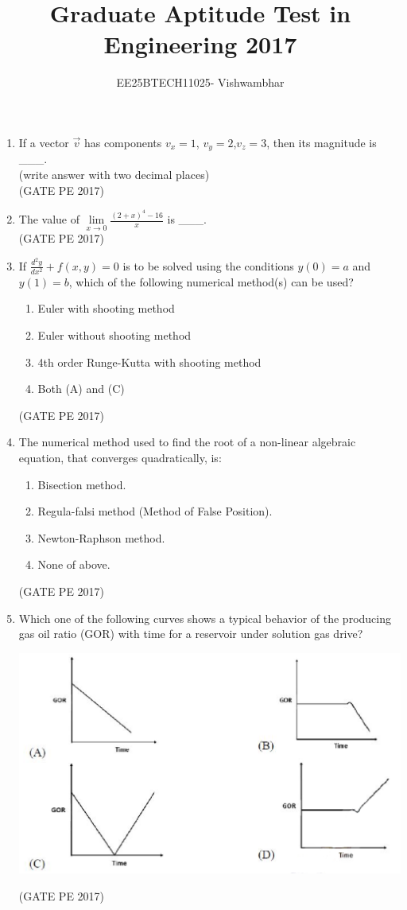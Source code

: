 \documentclass[journal,12pt,onecolumn]{IEEEtran}
\title{Graduate Aptitude Test in Engineering 2017}
\author{EE25BTECH11025- Vishwambhar}
\theoremstyle{remark}
\begin{document}
\maketitle

\begin{enumerate}[start=1, label={Q\arabic*.}]
 
\item If a vector $\vec{v}$ has components $v_x = 1$, $v_y = 2$,$v_z = 3$, then its magnitude is \_\_\_.\\
(write answer with two decimal places)\\

\hfill{(GATE PE 2017)}

\item The value of $\lim\limits_{x \to 0} \frac{(2 + x)^4 - 16}{x} $ is \_\_\_.\\

\hfill{(GATE PE 2017)}

\item If $\frac{d^2 y}{dx^2} + f(x, y) = 0$ is to be solved using the conditions $y(0) = a$ and $y(1) = b$, which of the following numerical method(s) can be used?
\begin{enumerate}
\item Euler with shooting method
\item Euler without shooting method
\item 4th order Runge-Kutta with shooting method
\item Both (A) and (C)
\end{enumerate}
\hfill{(GATE PE 2017)}

\item The numerical method used to find the root of a non-linear algebraic equation, that converges quadratically, is:
\begin{enumerate}
\item Bisection method.
\item Regula-falsi method (Method of False Position).
\item Newton-Raphson method.
\item None of above.
\end{enumerate}
\hfill{(GATE PE 2017)}

\item Which one of the following curves shows a typical behavior of the producing gas oil ratio (GOR) with time for a reservoir under solution gas drive?
\begin{center}
    \includegraphics[width=0.6\columnwidth]{Figs/GraphQ _5.png} 
\end{center}
\hfill{(GATE PE 2017)}


\end{enumerate}
\end{document}
